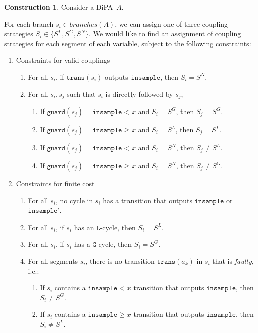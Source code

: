 \documentclass[12pt]{article}
\newcommand{\gguard}[1][x]{\texttt{insample}\geq #1}
\newcommand{\lguard}[1][x]{\texttt{insample} < #1}
\newcommand{\guard}{\texttt{guard}}
\newcommand{\trans}{\texttt{trans}}
\theoremstyle{definition}
\newtheorem{const}[thm]{Construction}
\begin{document}
\begin{const}\label{constraintsystem}
    Consider a DiPA~$A$.
    
    For each branch $s_i\in branches(A)$, we can assign one of three coupling strategies $S_i \in \{S^L, S^G, S^N\}$. We would like to find an assignment of coupling strategies for each segment of each variable, subject to the following constraints: 

    \begin{enumerate}
        \item Constraints for valid couplings\begin{enumerate}
            \item For all $s_i$, if $\trans(s_i)$ outputs $\texttt{insample}$, then $S_i = S^N$.
            \item For all $s_i, s_j$ such that $s_i$ is directly followed by $s_j$, \begin{enumerate}
                \item If $\guard(s_j)=\lguard$ and $S_i = S^G$, then $S_j = S^G$. 
                \item If $\guard(s_j) = \gguard$ and $S_i = S^L$, then $S_j = S^L$.
                \item If $\guard(s_j) = \lguard$ and $S_i = S^N$, then $S_j\neq S^L$.
                \item If $\guard(s_j) = \gguard$ and $S_i = S^N$, then $S_j\neq S^G$.
            \end{enumerate}
           
        \end{enumerate}
        \item Constraints for finite cost\begin{enumerate}
            \item For all $s_i$, no cycle in $s_i$ has a transition that outputs $\texttt{insample}$ or $\texttt{insample}'$. 
            \item For all $s_i$, if $s_i$ has an $\texttt{L}$-cycle, then $S_i = S^L$.
            \item For all $s_i$, if $s_i$ has a $\texttt{G}$-cycle, then $S_i = S^G$. 
            \item For all segments $s_i$, there is no transition $\trans(a_k)$ in $s_i$ that is \textit{faulty}, i.e.:\begin{enumerate}
                \item If $s_i$ contains a $\lguard$ transition that outputs $\texttt{insample}$, then $S_i \neq S^G$.
                \item If $s_i$ contains a $\gguard$ transition that outputs $\texttt{insample}$, then $S_i \neq S^L$.
            \end{enumerate}
        \end{enumerate}
    \end{enumerate}
\end{const}
\end{document}
